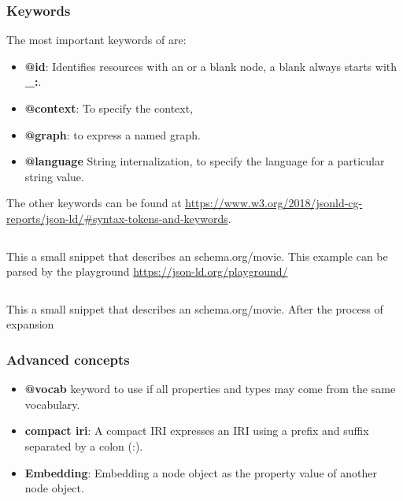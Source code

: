 \subsubsection{Keywords}
The most important keywords of  are:
\begin{itemize}
    \item \textbf{@id}: Identifies resources with an  or a blank node, a blank always starts with \textbf{\_:}.
    \item \textbf{@context}: To specify the context, 
    \item \textbf{@graph}: to express a named graph.
    \item \textbf{@language} String internalization, to specify the language for a particular string value.
\end{itemize}
The other keywords can be found at \url{https://www.w3.org/2018/jsonld-cg-reports/json-ld/#syntax-tokens-and-keywords}.

\begin{listing}[H]
    \inputminted[linenos,frame=single]{JSON-LD}{code/shema_movie_example_sita_raman.jsonld}
    \caption{This a small  snippet that describes an schema.org/movie. This example can be parsed by the  playground \url{https://json-ld.org/playground/}}
    \label{code: example:jsonmovie}
\end{listing}

\begin{listing}[H]
    \inputminted[linenos,frame=single]{JSON-LD}{code/expanded_shema_movie.jsonld}
    \caption{This a small  snippet that describes an schema.org/movie. After the process of expansion}
    \label{code: example:jsonmovie:expanded}
\end{listing}

\subsubsection{Advanced concepts}
\begin{itemize}
    \item \textbf{@vocab} keyword to use if all properties and types may come from the same vocabulary.
    \item \textbf{compact iri}: A compact IRI expresses an IRI using a prefix and suffix separated by a colon (:).
    \item \textbf{Embedding}: Embedding a node object as the property value of another node object.
\end{itemize}



